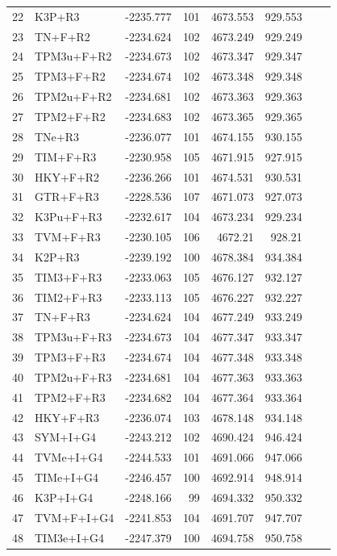 \documentclass[12pt]{article}
\begin{document}
\begin{longtable}{clrrrrrr}
	22 & K3P+R3 & -2235.777 & 101 & 4673.553 & 929.553 \\ 
	23 & TN+F+R2 & -2234.624 & 102 & 4673.249 & 929.249 \\ 
	24 & TPM3u+F+R2 & -2234.673 & 102 & 4673.347 & 929.347 \\ 
	25 & TPM3+F+R2 & -2234.674 & 102 & 4673.348 & 929.348 \\ 
	26 & TPM2u+F+R2 & -2234.681 & 102 & 4673.363 & 929.363 \\ 
	27 & TPM2+F+R2 & -2234.683 & 102 & 4673.365 & 929.365 \\ 
	28 & TNe+R3 & -2236.077 & 101 & 4674.155 & 930.155 \\ 
	29 & TIM+F+R3 & -2230.958 & 105 & 4671.915 & 927.915 \\ 
	30 & HKY+F+R2 & -2236.266 & 101 & 4674.531 & 930.531 \\ 
	31 & GTR+F+R3 & -2228.536 & 107 & 4671.073 & 927.073 \\ 
	32 & K3Pu+F+R3 & -2232.617 & 104 & 4673.234 & 929.234 \\ 
	33 & TVM+F+R3 & -2230.105 & 106 & 4672.21 & 928.21 \\ 
	34 & K2P+R3 & -2239.192 & 100 & 4678.384 & 934.384 \\ 
	35 & TIM3+F+R3 & -2233.063 & 105 & 4676.127 & 932.127 \\ 
	36 & TIM2+F+R3 & -2233.113 & 105 & 4676.227 & 932.227 \\ 
	37 & TN+F+R3 & -2234.624 & 104 & 4677.249 & 933.249 \\ 
	38 & TPM3u+F+R3 & -2234.673 & 104 & 4677.347 & 933.347 \\ 
	39 & TPM3+F+R3 & -2234.674 & 104 & 4677.348 & 933.348 \\ 
	40 & TPM2u+F+R3 & -2234.681 & 104 & 4677.363 & 933.363 \\ 
	41 & TPM2+F+R3 & -2234.682 & 104 & 4677.364 & 933.364 \\ 
	42 & HKY+F+R3 & -2236.074 & 103 & 4678.148 & 934.148 \\ 
	43 & SYM+I+G4 & -2243.212 & 102 & 4690.424 & 946.424 \\ 
	44 & TVMe+I+G4 & -2244.533 & 101 & 4691.066 & 947.066 \\ 
	45 & TIMe+I+G4 & -2246.457 & 100 & 4692.914 & 948.914 \\ 
	46 & K3P+I+G4 & -2248.166 & 99 & 4694.332 & 950.332 \\ 
	47 & TVM+F+I+G4 & -2241.853 & 104 & 4691.707 & 947.707 \\ 
	48 & TIM3e+I+G4 & -2247.379 & 100 & 4694.758 & 950.758 \\ 

\end{longtable}
\end{document}
